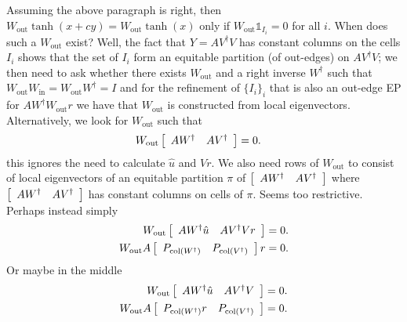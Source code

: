 \documentclass{article}
\newcommand{\mat}[2]{
    \IfInteger{#1}{
        \left[\begin{array}{*{#1}c} #2 \end{array}\right]
    }{
        \left[\begin{array}{#1} #2 \end{array}\right]}
    }
\newcommand{\Wout}{W_{\text{out}}}
\newcommand{\Win}{W_{\text{in}}}
\begin{document}
Assuming the above paragraph is right, then $\Wout \tanh(x+cy) = \Wout \tanh(x)$ only if $\Wout \mathbb{1}_{I_i} = 0$ for all $i$. When does such a $\Wout$ exist? Well, the fact that $Y=AV^\dagger V$ has constant columns on the cells $I_i$ shows that the set of $I_i$ form an equitable partition (of out-edges) on $AV^\dagger V$; we then need to ask whether there exists $\Wout$ and a right inverse $W^\dagger$ such that $\Wout \Win = \Wout W^\dagger = I$ and for the refinement of $\{I_i\}_i$ that is also an out-edge EP for $A W^\dagger \Wout r$  we have that $\Wout$ is constructed from local eigenvectors. Alternatively, we look for $\Wout$ such that 
\begin{align*}
    \Wout\mat{2}{AW^\dagger  & AV^\dagger} &= 0.
\end{align*}
this ignores the need to calculate $\hat u$ and $Vr$. We also need rows of $\Wout$ to consist of local eigenvectors of an equitable partition $\pi$ of $\mat{2}{AW^\dagger  & AV^\dagger}$ where $\mat{2}{AW^\dagger  & AV^\dagger}$ has constant columns on cells of $\pi$. Seems too restrictive. Perhaps instead simply
\begin{align*}
    \Wout\mat{2}{AW^\dagger \hat u  & AV^\dagger Vr} &= 0.
    \\
    \Wout A\mat{2}{P_{\operatorname{col}(W^\dagger)}  & P_{\operatorname{col}(V^\dagger)}}r &= 0.
\end{align*}
Or maybe in the middle
\begin{align*}
    \Wout\mat{2}{AW^\dagger \hat u  & AV^\dagger V} &= 0.
    \\
    \Wout A\mat{2}{P_{\operatorname{col}(W^\dagger)}r  & P_{\operatorname{col}(V^\dagger)}} &= 0.
\end{align*}
\end{document}
